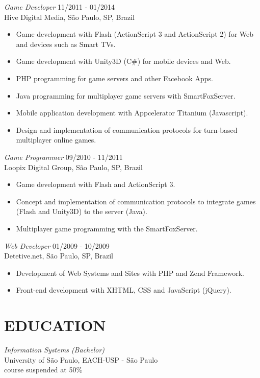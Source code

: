 \documentclass[line,margin]{res}
\begin{document}
\begin{resume}
				{\sl Game Developer} \hfill 11/2011 - 01/2014 \\
                Hive Digital Media, São Paulo, SP, Brazil
                 \begin{itemize}  \itemsep 1.25pt
                 \item Game development with Flash (ActionScript 3 and ActionScript 2) for Web and devices such as Smart TVs.
		 		 \item Game development with Unity3D (C\#) for mobile devices and Web.
                 \item PHP programming for game servers and other Facebook Apps.
                 \item Java programming for multiplayer game servers with SmartFoxServer.
		 		 \item Mobile application development with Appcelerator Titanium (Javascript).
                 \item Design and implementation of communication protocols for turn-based multiplayer online games.
                 \end{itemize}
                 
                {\sl Game Programmer} \hfill 09/2010 - 11/2011 \\
                Loopix Digital Group, São Paulo, SP, Brazil
                 \begin{itemize}  \itemsep 1.25pt
                 \item Game development with Flash and ActionScript 3.
                 \item Concept and implementation of communication protocols to integrate games (Flash and Unity3D) to the server (Java).
                 \item Multiplayer game programming with the SmartFoxServer.
                 \end{itemize}
 
                {\sl Web Developer} \hfill 01/2009 - 10/2009 \\
                Detetive.net, São Paulo, SP, Brazil
                 \begin{itemize}  \itemsep 1.25pt
                 \item Development of Web Systems and Sites with PHP and Zend Framework.
                 \item Front-end development with XHTML, CSS and JavaScript (jQuery).
                 \end{itemize} 

\section{EDUCATION} {\sl Information Systems (Bachelor)} \\
                University of São Paulo, EACH-USP - São Paulo \\
                course suspended at 50\%
		

\end{resume}
\end{document}
